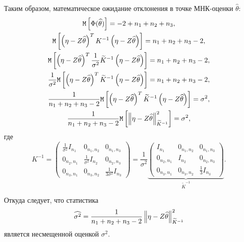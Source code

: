 Таким образом, математическое ожидание отклонения в точке МНК-оценки $\widehat{\theta}$:
\begin{gather}
    \mathtt{M} \left [ \Phi(\widehat{\theta}) \right ] = -2 + n_1 + n_2 + n_3 , \\
    \mathtt{M} \left [ \left ( \eta - Z \widehat{\theta} \right )^T K^{-1} \left ( \eta - Z \widehat{\theta} \right ) \right ] = n_1 + n_2 + n_3 - 2 , \\
    \mathtt{M} \left [ \left ( \eta - Z \widehat{\theta} \right )^T \frac{1}{\sigma^2} \widetilde{K}^{-1} \left ( \eta - Z \widehat{\theta} \right ) \right ] = n_1 + n_2 + n_3 - 2 , \\
    \frac{1}{\sigma^2} \mathtt{M} \left [ \left ( \eta - Z \widehat{\theta} \right )^T \widetilde{K}^{-1} \left ( \eta - Z \widehat{\theta} \right ) \right ] = n_1 + n_2 + n_3 - 2 , \\
    \frac{1}{n_1 + n_2 + n_3 - 2} \mathtt{M} \left [ \left ( \eta - Z \widehat{\theta} \right )^T \widetilde{K}^{-1} \left ( \eta - Z \widehat{\theta} \right ) \right ] = \sigma^2 , \\
    \frac{1}{n_1 + n_2 + n_3 - 2} \mathtt{M} \left [ \left \| {\eta - Z \widehat{\theta}} \right \|_{\widetilde{K}^{-1}}^2 \right ] = \sigma^2 ,
\end{gather}
где
\begin{equation}
    K^{-1}
    = \begin{pmatrix}
          \frac{1}{\sigma^2} I_{n_1} & 0_{n_1,n_2}                & 0_{n_1,n_3}                  \\
          0_{n_2,n_1}                & \frac{1}{\sigma^2} I_{n_2} & 0_{n_2,n_3}                  \\
          0_{n_3,n_1}                & 0_{n_3,n_2}                & \frac{1}{3 \sigma^2} I_{n_3}
    \end{pmatrix}
    = \frac{1}{\sigma^2}
    \underbrace{
        \begin{pmatrix}
            I_{n_1}     & 0_{n_1,n_2} & 0_{n_1,n_3}         \\
            0_{n_2,n_1} & I_{n_2}     & 0_{n_2,n_3}         \\
            0_{n_3,n_1} & 0_{n_3,n_2} & \frac{1}{3} I_{n_3}
        \end{pmatrix}
    }_{\widetilde{K}^{-1}} .
\end{equation}

Откуда следует, что статистика
\begin{equation}
    \widehat{\sigma^2} = \frac{1}{n_1 + n_2 + n_3 - 2} \left \| {\eta - Z \widehat{\theta}} \right \|_{\widetilde{K}^{-1}}^2
\end{equation}
является несмещенной оценкой $\sigma^2$.

